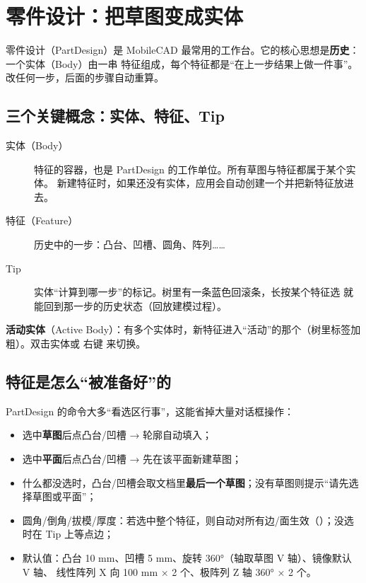 \chapter{零件设计：把草图变成实体}

零件设计（PartDesign）是 MobileCAD 最常用的工作台。它的核心思想是\textbf{历史}：一个实体（Body）由一串
特征组成，每个特征都是“在上一步结果上做一件事”。改任何一步，后面的步骤自动重算。

\section{三个关键概念：实体、特征、Tip}

\begin{description}
  \item[实体（Body）] 特征的容器，也是 PartDesign 的工作单位。所有草图与特征都属于某个实体。
        新建特征时，如果还没有实体，应用会自动创建一个并把新特征放进去。
  \item[特征（Feature）] 历史中的一步：凸台、凹槽、圆角、阵列……
  \item[Tip] 实体“计算到哪一步”的标记。树里有一条蓝色回滚条，长按某个特征选 
        就能回到那一步的历史状态（回放建模过程）。
\end{description}

\textbf{活动实体}（Active Body）：有多个实体时，新特征进入“活动”的那个（树里标签加粗）。双击实体或
右键  来切换。

\section{特征是怎么“被准备好”的}

PartDesign 的命令大多“看选区行事”，这能省掉大量对话框操作：

\begin{itemize}
  \item 选中\textbf{草图}后点凸台/凹槽 → 轮廓自动填入；
  \item 选中\textbf{平面}后点凸台/凹槽 → 先在该平面新建草图；
  \item 什么都没选时，凸台/凹槽会取文档里\textbf{最后一个草图}；没有草图则提示“请先选择草图或平面”；
  \item 圆角/倒角/拔模/厚度：若选中整个特征，则自动对所有边/面生效（）；没选时在 Tip 上等点边；
  \item 默认值：凸台 10 mm、凹槽 5 mm、旋转 360°（轴取草图 V 轴）、镜像默认 V 轴、
        线性阵列 X 向 100 mm × 2 个、极阵列 Z 轴 360° × 2 个。
\end{itemize}


